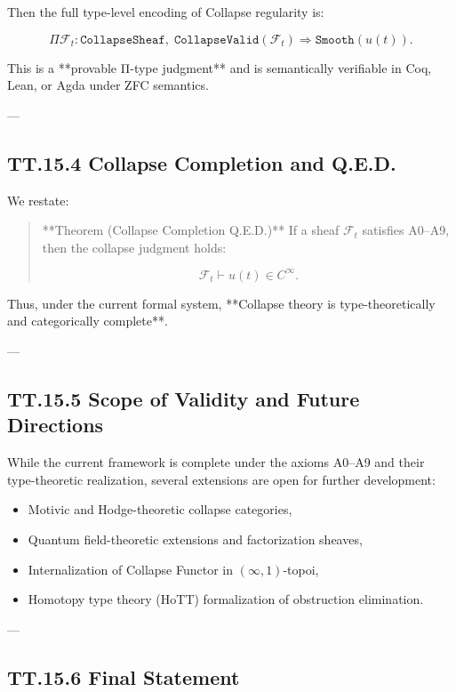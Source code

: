 \documentclass[11pt]{article}
\begin{document}
Then the full type-level encoding of Collapse regularity is:

\[
\Pi \mathcal{F}_t : \texttt{CollapseSheaf},\;
\texttt{CollapseValid}(\mathcal{F}_t)
\Rightarrow \texttt{Smooth}(u(t)).
\]

This is a **provable Π-type judgment** and is semantically verifiable in Coq, Lean, or Agda under ZFC semantics.

---

\subsection*{TT.15.4 Collapse Completion and Q.E.D.}

We restate:

\begin{quote}
**Theorem (Collapse Completion Q.E.D.)**  
If a sheaf $\mathcal{F}_t$ satisfies A0–A9, then the collapse judgment holds:

\[
\mathcal{F}_t \vdash u(t) \in C^\infty.
\]
\end{quote}

Thus, under the current formal system, **Collapse theory is type-theoretically and categorically complete**.

---

\subsection*{TT.15.5 Scope of Validity and Future Directions}

While the current framework is complete under the axioms A0–A9 and their type-theoretic realization,  
several extensions are open for further development:

\begin{itemize}
  \item Motivic and Hodge-theoretic collapse categories,
  \item Quantum field-theoretic extensions and factorization sheaves,
  \item Internalization of Collapse Functor in $(\infty,1)$-topoi,
  \item Homotopy type theory (HoTT) formalization of obstruction elimination.
\end{itemize}

---

\subsection*{TT.15.6 Final Statement}
\end{document}
